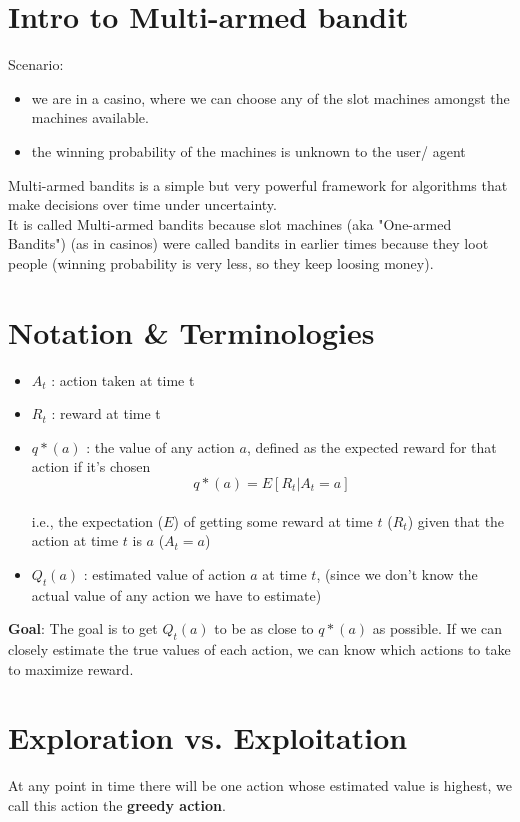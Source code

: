 \section{Intro to Multi-armed bandit}
Scenario: 
\begin{itemize}
    \item we are in a casino, where we can choose any of the slot machines amongst the machines available.
    \item the winning probability of the machines is unknown to the user/ agent
\end{itemize}
Multi-armed bandits is a simple but very powerful framework for algorithms that make decisions over time under uncertainty.\\
It is called Multi-armed bandits because slot machines (aka "One-armed Bandits") (as in casinos) were called bandits in earlier times because they loot people (winning probability is very less, so they keep loosing money).

\section{Notation \& Terminologies \cite{medium-numsmt2-rl-ch2-part-1}}
\begin{itemize}
    \item $A_t$ : action taken at time t
    \item $R_t$ : reward at time t
    \item $q*(a)$ : the value of any action $a$, defined as the expected reward for that action if it’s chosen \[
        q*(a) = E[R_t | A_t = a]
    \]\\[-0.5cm]
    i.e., the expectation ($E$) of getting some reward at time $t$ ($R_t$) given that the action at time $t$ is $a$ ($A_t = a$)
    \item $Q_t(a)$ : estimated value of action $a$ at time $t$, (since we don’t know the actual value of any action we have to estimate)
\end{itemize}

\textbf{Goal}: The goal is to get $Q_t(a)$ to be as close to $q*(a)$ as possible. If we can closely estimate the true values of each action, we can know which actions to take to maximize reward.

\section{Exploration vs. Exploitation \cite{medium-numsmt2-rl-ch2-part-1}}\label{Exploration vs. Exploitation}
At any point in time there will be one action whose estimated value is highest, we call this action the \textbf{greedy action}.

